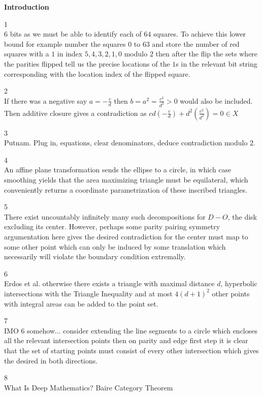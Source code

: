 \Large

\textbf{Introduction}

1 \\
$\boxed{6}$ bits as we must be able to identify each of $64$ squares. To achieve this lower bound for example number the squares $0$ to $63$ and store the number of red squares with a $1$ in index $5,4,3,2,1,0$ modulo $2$ then after the flip the sets where the parities flipped tell us the precise locations of the $1$s in the relevant bit string corresponding with the location index of the flipped square.

2 \\
If there was a negative say $a=-\frac{c}{d}$ then $b=a^2=\frac{c^2}{d^2}>0$ would also be included. Then additive closure gives a contradiction as $cd\left(-\frac{c}{d} \right)+d^2\left(\frac{c^2}{d^2} \right)=0 \in X$

3 \\
Putnam. Plug in, equations, clear denominators, deduce contradiction modulo $2$.

4 \\
An affine plane transformation sends the ellipse to a circle, in which case smoothing yields that the area maximizing triangle must be equilateral, which conveniently returns a coordinate parametrization of these inscribed triangles.

5 \\
There exist uncountably infinitely many such decompositions for $D - O$, the disk excluding its center. However, perhaps some parity pairing symmetry argumentation here gives the desired contradiction for the center must map to some other point which can only be induced by some translation which necessarily will violate the boundary condition extremally.

6 \\
Erdos et al. otherwise there exists a triangle with maximal distance $d$, hyperbolic intersections with the Triangle Inequality and at most $4(d+1)^2$ other points with integral areas can be added to the point set.

7 \\
IMO 6 somehow... consider extending the line segments to a circle which encloses all the relevant intersection points then on parity and edge first step it is clear that the set of starting points must consist of every other intersection which gives the desired in both directions.

8 \\
What Is Deep Mathematics? Baire Category Theorem

